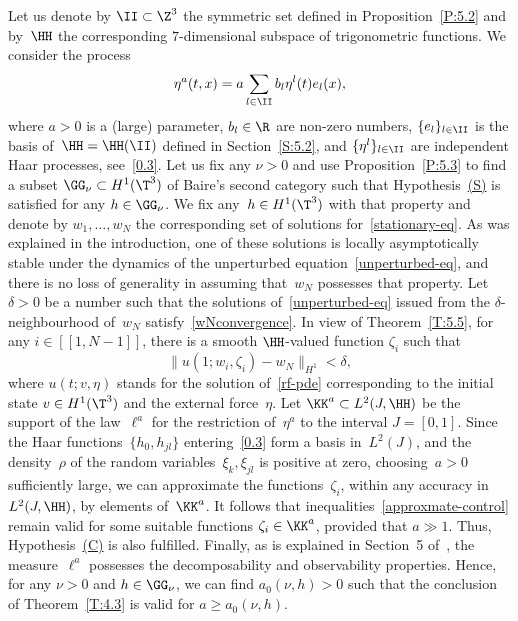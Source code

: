 \begin{example}
Let us denote by $\II\subset\Z^3$ the symmetric set defined in Proposition~\ref{P:5.2} and by~$\HH$ the corresponding $7$-dimensional subspace of trigonometric functions. We consider the process
\begin{equation*}
\eta^a(t,x)=a\sum_{l\in\II}b_l\eta^l(t)e_l(x),
\end{equation*}
where $a>0$ is a (large) parameter, $b_l\in\R$ are non-zero numbers, $\{e_l\}_{l\in\II}$ is the basis of~$\HH=\HH(\II)$ defined in Section~\ref{S:5.2}, and $\{\eta^l\}_{l\in\II}$ are independent Haar processes, see~\eqref{0.3}. Let us fix any $\nu>0$ and use Proposition~\ref{P:5.3} to find a subset $\GG_\nu\subset H^1(\T^3)$ of Baire's second category such that Hypothesis~\hyperlink{S}{(S)} is satisfied for any $h\in\GG_\nu$. We fix any~$h\in H^1(\T^3)$ with that property and denote by $w_1,\dots,w_N$ the corresponding set of solutions for~\eqref{stationary-eq}. As was explained in the introduction, one of these solutions is locally asymptotically stable under the dynamics of the unperturbed equation~\eqref{unperturbed-eq}, and there is no loss of generality in assuming that~$w_N$ possesses that property. Let $\delta>0$ be a number such that the solutions of~\eqref{unperturbed-eq} issued from the $\delta$-neighbourhood of~$w_N$ satisfy~\eqref{wNconvergence}. In view of Theorem~\ref{T:5.5}, for any $i\in[\![1,N-1]\!]$, there is a smooth $\HH$-valued function $\zeta_i$ such that
\begin{equation} \label{approxmate-control}
\|u(1;w_i,\zeta_i)-w_N\|_{H^1}<\delta,
\end{equation}
where $u(t;v,\eta)$ stands for the solution of~\eqref{rf-pde} corresponding to the initial state $v\in H^1(\T^3)$ and the external force~$\eta$. Let $\KK^a\subset L^2(J,\HH)$ be the support of the law~$\ell^a$ for the restriction of~$\eta^a$ to the interval $J=[0,1]$. Since the Haar functions~$\{h_0,h_{jl}\}$ entering~\eqref{0.3} form a basis in~$L^2(J)$, and the density~$\rho$ of the random variables~$\xi_k,\xi_{jl}$ is positive at zero, choosing~$a>0$ sufficiently large, we can approximate the functions~$\zeta_i$, within any accuracy in~$L^2(J,\HH)$, by elements of~$\KK^a$. It follows that inequalities~\eqref{approxmate-control} remain valid for some suitable functions $\zeta_i\in\KK^a$, provided that $a\gg1$. Thus, Hypothesis~\hyperlink{C}{(C)} is also fulfilled. Finally, as is explained in Section~5 of~\cite{KNS-2020}, the measure~$\ell^a$ possesses the decomposability and observability properties. Hence, for any $\nu>0$ and $h\in \GG_\nu$, we can find $a_0(\nu,h)>0$ such that the conclusion of Theorem~\ref{T:4.3} is valid for $a\ge a_0(\nu,h)$.
\end{example}

